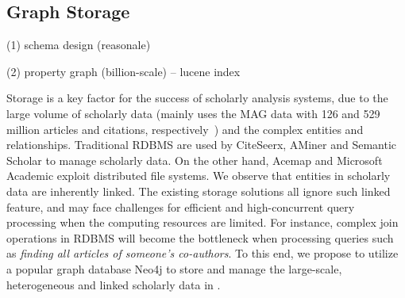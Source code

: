 \subsection{Graph Storage}


(1) schema design (reasonale)

(2) property graph (billion-scale) -- lucene index 

Storage is a key factor for the success of scholarly analysis systems, due to the large volume of scholarly data (\eg \oursystem mainly uses the MAG data with 126 and 529 million articles and citations, respectively~\cite{sinha2015overview}) and the complex entities and relationships. 
%
Traditional RDBMS are used by CiteSeerx, AMiner and Semantic Scholar to manage scholarly data. On the other hand, Acemap and Microsoft Academic exploit distributed file systems.
%
We observe that entities in scholarly data are inherently linked. The existing storage solutions all ignore such linked feature, and may face challenges for efficient and high-concurrent query processing when the computing resources are limited. For instance, complex join operations in RDBMS will become the bottleneck when processing queries such as {\em finding all articles of someone's co-authors}.
%
To this end, we propose to utilize a popular graph database Neo4j to store and manage the large-scale, heterogeneous and linked scholarly data in \oursystem.


